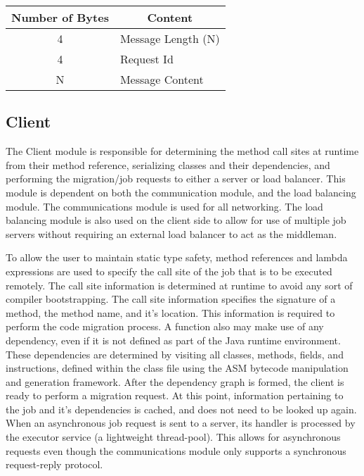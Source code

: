 \begin{minipage}{\linewidth}

    \setlength{\belowcaptionskip}{15pt plus 3pt minus 2pt}
    \begin{tabular}{ c l }
        \hline
        \multicolumn{1}{c}{Number of Bytes} & \multicolumn{1}{c}{Content} \\
        \hline
        4 & Message Length (N) \\
        4 & Request Id \\
        N & Message Content \\
    \end{tabular}

\end{minipage}


\subsection{Client}\label{subsec:client}
The Client module is responsible for determining the method call sites at runtime from their
method reference, serializing classes and their dependencies, and performing the migration/job
requests to either a server or load balancer.
This module is dependent on both the communication module, and the load balancing module.
The communications module is used for all networking.
The load balancing module is also used on the client side to allow for use of multiple
job servers without requiring an external load balancer to act as the middleman.

To allow the user to maintain static type safety, method references and lambda expressions
are used to specify the call site of the job that is to be executed remotely.
The call site information is determined at runtime to avoid any sort of compiler
bootstrapping.
The call site information specifies the signature of a method, the method name, and it's location.
This information is required to perform the code migration process.
A function also may make use of any dependency, even if it is not defined as part of the Java
runtime environment.
These dependencies are determined by visiting all classes, methods, fields, and instructions,
defined within the class file using the ASM bytecode manipulation and generation framework.
After the dependency graph is formed, the client is ready to perform a migration request.
At this point, information pertaining to the job and it's dependencies is cached, and does
not need to be looked up again.
When an asynchronous job request is sent to a server, its handler is processed by the executor service
(a lightweight thread-pool).
This allows for asynchronous requests even though the communications module only
supports a synchronous request-reply protocol.

